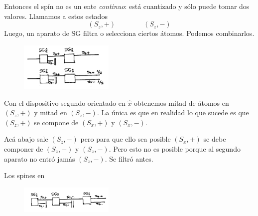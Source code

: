 \documentclass[10pt,oneside]{CBFT_book}
\begin{document}
Entonces el spín no es un ente {\it continuo}: está cuantizado y sólo puede tomar dos valores.
Llamamos a estos estados
\[
	(S_z,+) \qquad \qquad (S_z,-)
\]
Luego, un aparato de SG filtra o selecciona ciertos átomos. Podemos combinarlos.

\begin{figure}[htb]
	\begin{center}
	\includegraphics[width=0.4\textwidth]{images/teo2_3.pdf}	 
	\end{center}
	\caption{}
\end{figure} 

Con el dispositivo segundo orientado en $\hat{x}$ obtenemos mitad de átomos en
$(S_z,+)$ y mitad en $(S_z,-)$. La única es que en realidad lo que sucede es que 
$(S_z,+)$ se compone de $(S_x,+)$ y $(S_x,-)$.

Acá abajo sale $(S_z,-)$ pero para que ello sea posible 
$(S_x,+)$ se debe componer de $(S_z,+)$ y $(S_z,-)$. Pero esto no es posible
porque al segundo aparato no entró jamás $(S_z,-)$. Se filtró antes.

Los spines en 

\begin{figure}[htb]
	\begin{center}
	\includegraphics[width=0.4\textwidth]{images/teo2_4.pdf}	 
	\end{center}
	\caption{}
\end{figure} 



\end{document}
